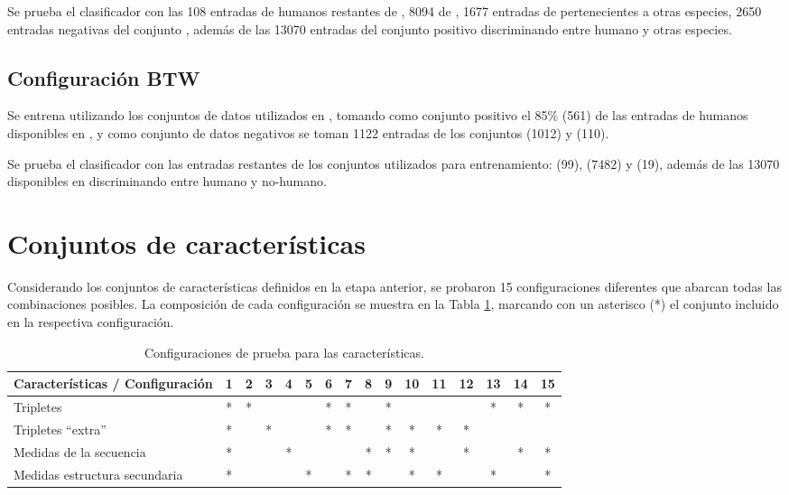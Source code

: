 \documentclass[12pt,bibliography=oldstyle,DIV=12,parskip=half-,titlepage]{scrartcl}
\begin{document}
Se prueba el clasificador con las 108 entradas de humanos restantes de
, 8094 de , 1677 entradas de
 pertenecientes a otras especies, 2650 entradas
negativas del conjunto , además de las 13070
entradas del conjunto positivo  discriminando entre
humano y otras especies.
%
\subsection{Configuración BTW}
Se entrena utilizando los conjuntos de datos utilizados en
\cite{batuwita}, tomando como conjunto positivo el 85\% (561) de las
entradas de humanos disponibles en , y como conjunto de
datos negativos se toman 1122 entradas de los conjuntos 
(1012) y  (110).

Se prueba el clasificador con las entradas restantes de los conjuntos
utilizados para entrenamiento:  (99), 
(7482) y  (19), además de las 13070 disponibles en
 discriminando entre humano y no-humano.
%


\section{Conjuntos de características}
Considerando los conjuntos de características definidos en la etapa anterior,
se probaron 15 configuraciones diferentes que abarcan todas las combinaciones
posibles. La composición de cada configuración se muestra en la Tabla
\ref{featsets}, marcando con un asterisco (*) el conjunto incluido en la respectiva configuración.

\begin{table}[H]
  \caption{Configuraciones de prueba para las características.}
  \center%
  \begin{tabular}{lccccccccccccccc}\toprule
Características / Configuración & 1& 2& 3& 4& 5& 6& 7& 8& 9&10&11&12&13&14&15\\
\midrule
Tripletes                       & *& *&  &  &  & *& *&  & *&  &  &  & *& *& *\\
Tripletes ``extra''             & *&  & *&  &  & *& *&  & *& *& *& *&  &  &  \\
Medidas de la secuencia         & *&  &  & *&  &  &  & *& *& *&  & *&  & *& *\\
Medidas estructura secundaria   & *&  &  &  & *&  & *& *&  & *& *&  & *&  & *\\
\bottomrule
  \end{tabular}
  \label{featsets}
\end{table}
\end{document}
